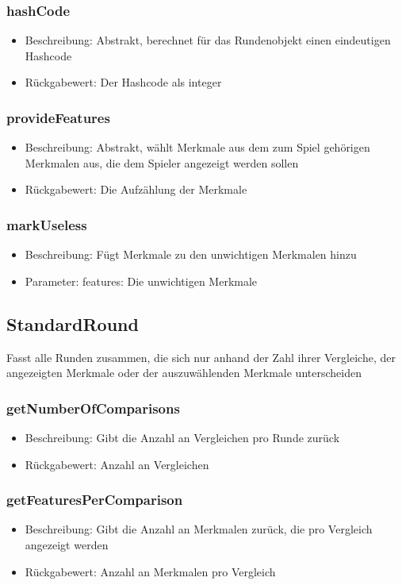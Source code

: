 \documentclass[a4paper]{scrreprt}
\begin{document}
	\subsubsection{hashCode}
	\begin{itemize}
	\item Beschreibung: Abstrakt, berechnet für das Rundenobjekt einen eindeutigen Hashcode
	\item Rückgabewert: Der Hashcode als integer
	\end{itemize}
	\subsubsection{provideFeatures}
				\begin{itemize}
					\item Beschreibung: Abstrakt, wählt Merkmale aus dem zum Spiel gehörigen Merkmalen aus, die dem Spieler angezeigt werden sollen
					\item Rückgabewert: Die Aufzählung der Merkmale
				\end{itemize}
	\subsubsection{markUseless}
		\begin{itemize}
			\item Beschreibung: Fügt Merkmale zu den unwichtigen Merkmalen hinzu
			\item Parameter: features: Die unwichtigen Merkmale
		\end{itemize}

	\subsection{StandardRound}
	Fasst alle Runden zusammen, die sich nur anhand der Zahl ihrer Vergleiche, der angezeigten Merkmale oder der auszuwählenden Merkmale unterscheiden
	\subsubsection{getNumberOfComparisons}
	\begin{itemize}
		\item Beschreibung: Gibt die Anzahl an Vergleichen pro Runde zurück
		\item Rückgabewert: Anzahl an Vergleichen
	\end{itemize}
	\subsubsection{getFeaturesPerComparison}
	\begin{itemize}
		\item Beschreibung: Gibt die Anzahl an Merkmalen zurück, die pro Vergleich angezeigt werden
		\item Rückgabewert: Anzahl an Merkmalen pro Vergleich
	\end{itemize}
\end{document}
